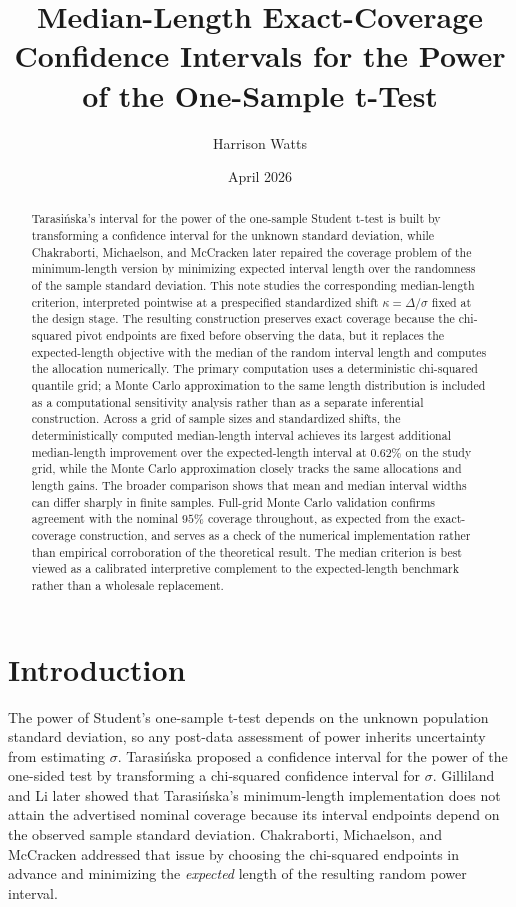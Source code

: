 \documentclass[11pt]{article}
\title{Median-Length Exact-Coverage Confidence Intervals for the Power of the One-Sample t-Test}
\author{Harrison Watts}
\date{April 2026}
\begin{document}
\maketitle

\begin{abstract}
Tarasi\'{n}ska's interval for the power of the one-sample Student t-test is built by transforming a confidence interval for the unknown standard deviation, while Chakraborti, Michaelson, and McCracken later repaired the coverage problem of the minimum-length version by minimizing expected interval length over the randomness of the sample standard deviation. This note studies the corresponding median-length criterion, interpreted pointwise at a prespecified standardized shift $\kappa=\Delta/\sigma$ fixed at the design stage. The resulting construction preserves exact coverage because the chi-squared pivot endpoints are fixed before observing the data, but it replaces the expected-length objective with the median of the random interval length and computes the allocation numerically. The primary computation uses a deterministic chi-squared quantile grid; a Monte Carlo approximation to the same length distribution is included as a computational sensitivity analysis rather than as a separate inferential construction. Across a grid of sample sizes and standardized shifts, the deterministically computed median-length interval achieves its largest additional median-length improvement over the expected-length interval at $0.62\%$ on the study grid, while the Monte Carlo approximation closely tracks the same allocations and length gains. The broader comparison shows that mean and median interval widths can differ sharply in finite samples. Full-grid Monte Carlo validation confirms agreement with the nominal $95\%$ coverage throughout, as expected from the exact-coverage construction, and serves as a check of the numerical implementation rather than empirical corroboration of the theoretical result. The median criterion is best viewed as a calibrated interpretive complement to the expected-length benchmark rather than a wholesale replacement.
\end{abstract}

\section{Introduction}
The power of Student's one-sample t-test depends on the unknown population standard deviation, so any post-data assessment of power inherits uncertainty from estimating $\sigma$. Tarasi\'{n}ska \citep{tarasinska2005power} proposed a confidence interval for the power of the one-sided test by transforming a chi-squared confidence interval for $\sigma$. Gilliland and Li \citep{gilliland2008note} later showed that Tarasi\'{n}ska's minimum-length implementation does not attain the advertised nominal coverage because its interval endpoints depend on the observed sample standard deviation. Chakraborti, Michaelson, and McCracken \citep{chakraborti2012shortest} addressed that issue by choosing the chi-squared endpoints in advance and minimizing the \emph{expected} length of the resulting random power interval.
\end{document}
